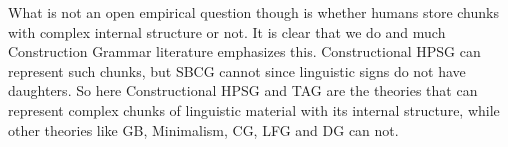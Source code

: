 \addlines[-1]
What is not an open empirical question though is whether humans store chunks with complex internal
structure or not. It is clear that we do and much Construction Grammar literature emphasizes
this. Constructional HPSG can represent such chunks, but SBCG cannot since linguistic signs do not
have daughters. So here Constructional HPSG and TAG are the theories that can represent complex
chunks of linguistic material with its internal structure, while other theories like GB,
Minimalism, CG, LFG and DG can not.





  
